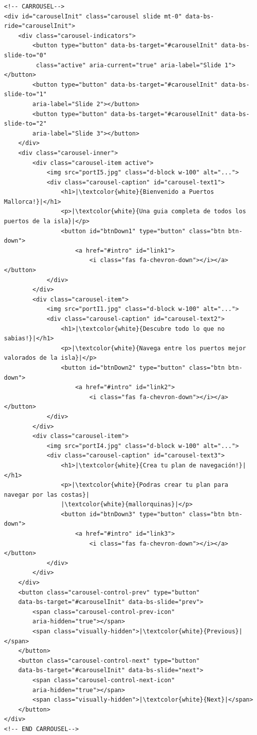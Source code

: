 \documentclass{article}
\begin{document}
\begin{verbatim}
<!-- CARROUSEL-->
<div id="carouselInit" class="carousel slide mt-0" data-bs-ride="carouselInit">
    <div class="carousel-indicators">
        <button type="button" data-bs-target="#carouselInit" data-bs-slide-to="0"
         class="active" aria-current="true" aria-label="Slide 1"></button>
        <button type="button" data-bs-target="#carouselInit" data-bs-slide-to="1" 
        aria-label="Slide 2"></button>
        <button type="button" data-bs-target="#carouselInit" data-bs-slide-to="2" 
        aria-label="Slide 3"></button>
    </div>
    <div class="carousel-inner">
        <div class="carousel-item active">
            <img src="portI5.jpg" class="d-block w-100" alt="...">
            <div class="carousel-caption" id="carousel-text1">
                <h1>|\textcolor{white}{Bienvenido a Puertos Mallorca!}|</h1>
                <p>|\textcolor{white}{Una guia completa de todos los puertos de la isla}|</p>
                <button id="btnDown1" type="button" class="btn btn-down">
                    <a href="#intro" id="link1">
                        <i class="fas fa-chevron-down"></i></a></button>
            </div>
        </div>
        <div class="carousel-item">
            <img src="portI1.jpg" class="d-block w-100" alt="...">
            <div class="carousel-caption" id="carousel-text2">
                <h1>|\textcolor{white}{Descubre todo lo que no sabias!}|</h1>
                <p>|\textcolor{white}{Navega entre los puertos mejor valorados de la isla}|</p>
                <button id="btnDown2" type="button" class="btn btn-down">
                    <a href="#intro" id="link2">
                        <i class="fas fa-chevron-down"></i></a></button>
            </div>
        </div>
        <div class="carousel-item">
            <img src="portI4.jpg" class="d-block w-100" alt="...">
            <div class="carousel-caption" id="carousel-text3">
                <h1>|\textcolor{white}{Crea tu plan de navegación!}|</h1>
                <p>|\textcolor{white}{Podras crear tu plan para navegar por las costas}| 
                |\textcolor{white}{mallorquinas}|</p>
                <button id="btnDown3" type="button" class="btn btn-down">
                    <a href="#intro" id="link3">
                        <i class="fas fa-chevron-down"></i></a></button>
            </div>
        </div>
    </div>
    <button class="carousel-control-prev" type="button" 
    data-bs-target="#carouselInit" data-bs-slide="prev">
        <span class="carousel-control-prev-icon" 
        aria-hidden="true"></span>
        <span class="visually-hidden">|\textcolor{white}{Previous}|</span>
    </button>
    <button class="carousel-control-next" type="button" 
    data-bs-target="#carouselInit" data-bs-slide="next">
        <span class="carousel-control-next-icon" 
        aria-hidden="true"></span>
        <span class="visually-hidden">|\textcolor{white}{Next}|</span>
    </button>
</div>
<!-- END CARROUSEL-->
\end{verbatim}
\end{document}
